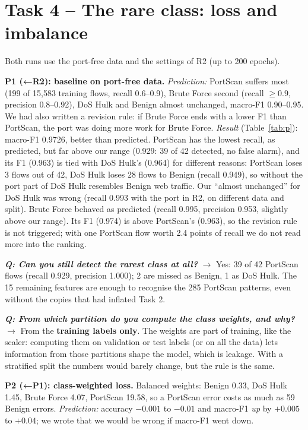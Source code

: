 \documentclass[9pt]{extarticle}
\newcommand{\Q}[1]{\textbf{\emph{Q: #1}}}
\newcommand{\run}[1]{\textsf{#1}}
\begin{document}
\section{Task 4 -- The rare class: loss and imbalance}
Both runs use the port-free data and the settings of \run{R2} (up to 200 epochs).

\textbf{\run{P1 (←R2)}: baseline on port-free data.} \emph{Prediction:} PortScan suffers most (199 of 15,583 training flows, recall 0.6--0.9), Brute Force second (recall $\ge 0.9$, precision 0.8--0.92), DoS Hulk and Benign almost unchanged, macro-F1 0.90--0.95. We had also written a revision rule: if Brute Force ends with a lower F1 than PortScan, the port was doing more work for Brute Force. \emph{Result} (Table~\ref{tab:p}): macro-F1 0.9726, better than predicted. PortScan has the lowest recall, as predicted, but far above our range (0.929: 39 of 42 detected, no false alarm), and its F1 (0.963) is tied with DoS Hulk's (0.964) for different reasons: PortScan loses 3 flows out of 42, DoS Hulk loses 28 flows to Benign (recall 0.949), so without the port part of DoS Hulk resembles Benign web traffic. Our ``almost unchanged'' for DoS Hulk was wrong (recall 0.993 with the port in \run{R2}, on different data and split). Brute Force behaved as predicted (recall 0.995, precision 0.953, slightly above our range). Its F1 (0.974) is above PortScan's (0.963), so the revision rule is not triggered; with one PortScan flow worth 2.4 points of recall we do not read more into the ranking.

\Q{Can you still detect the rarest class at all?} $\rightarrow$ Yes: 39 of 42 PortScan flows (recall 0.929, precision 1.000); 2 are missed as Benign, 1 as DoS Hulk. The 15 remaining features are enough to recognise the 285 PortScan patterns, even without the copies that had inflated Task 2.

\Q{From which partition do you compute the class weights, and why?} $\rightarrow$ From the \textbf{training labels only}. The weights are part of training, like the scaler: computing them on validation or test labels (or on all the data) lets information from those partitions shape the model, which is leakage. With a stratified split the numbers would barely change, but the rule is the same.

\textbf{\run{P2 (←P1)}: class-weighted loss.} Balanced weights: Benign 0.33, DoS Hulk 1.45, Brute Force 4.07, PortScan 19.58, so a PortScan error costs as much as 59 Benign errors. \emph{Prediction:} accuracy $-0.001$ to $-0.01$ and macro-F1 \emph{up} by $+0.005$ to $+0.04$; we wrote that we would be wrong if macro-F1 went down.
\end{document}
